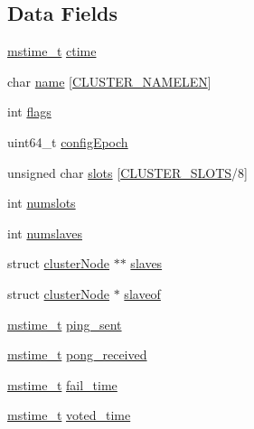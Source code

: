 \subsection*{Data Fields}
\begin{DoxyCompactItemize}
\item 
\hyperlink{redismodule_8h_a652ae61e2475bc8957454534544968fc}{mstime\+\_\+t} \hyperlink{structcluster_node_a7e18258d5320891f16483de560a5a551}{ctime}
\item 
char \hyperlink{structcluster_node_a5d3e2cfb46d2a665115ea2b362063396}{name} \mbox{[}\hyperlink{cluster_8h_ace7a882972eff7149675252938643b6e}{C\+L\+U\+S\+T\+E\+R\+\_\+\+N\+A\+M\+E\+L\+EN}\mbox{]}
\item 
int \hyperlink{structcluster_node_ac8bf36fe0577cba66bccda3a6f7e80a4}{flags}
\item 
uint64\+\_\+t \hyperlink{structcluster_node_a6bf0844859acadf5df37a7d49595680e}{config\+Epoch}
\item 
unsigned char \hyperlink{structcluster_node_a5860192f55932c04b85ec15307ee114b}{slots} \mbox{[}\hyperlink{cluster_8h_aa3e2cb951eebb16725ecc3f5beefd9fd}{C\+L\+U\+S\+T\+E\+R\+\_\+\+S\+L\+O\+TS}/8\mbox{]}
\item 
int \hyperlink{structcluster_node_a349a9876a2d953d6c146f1b324d5cc8a}{numslots}
\item 
int \hyperlink{structcluster_node_a0fc6a1a68f27049fc36cc42bf7c96208}{numslaves}
\item 
struct \hyperlink{structcluster_node}{cluster\+Node} $\ast$$\ast$ \hyperlink{structcluster_node_a0dcce9d83c3abdcf726eada2a2b747b6}{slaves}
\item 
struct \hyperlink{structcluster_node}{cluster\+Node} $\ast$ \hyperlink{structcluster_node_a6a719a7df6dd52ea8f73b741001c2540}{slaveof}
\item 
\hyperlink{redismodule_8h_a652ae61e2475bc8957454534544968fc}{mstime\+\_\+t} \hyperlink{structcluster_node_a83ac63444059326fd11192ee837f5237}{ping\+\_\+sent}
\item 
\hyperlink{redismodule_8h_a652ae61e2475bc8957454534544968fc}{mstime\+\_\+t} \hyperlink{structcluster_node_a75edda4c1e1a12f413686e691938cb56}{pong\+\_\+received}
\item 
\hyperlink{redismodule_8h_a652ae61e2475bc8957454534544968fc}{mstime\+\_\+t} \hyperlink{structcluster_node_adbfcc788af3c74e0607f1daa843d487e}{fail\+\_\+time}
\item 
\hyperlink{redismodule_8h_a652ae61e2475bc8957454534544968fc}{mstime\+\_\+t} \hyperlink{structcluster_node_ab7d11a3ddcc8b368b6ed249fb50b744b}{voted\+\_\+time}
$$
\end{DoxyCompactItemize}
